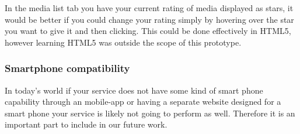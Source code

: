 In the media list tab you have your current rating of media displayed as stars, it would be better if you could change your rating simply by hovering over the star you want to give it and then clicking. This could be done effectively in HTML5, however learning HTML5 was outside the scope of this prototype.

\subsubsection{Smartphone compatibility}
In today's world if your service does not have some kind of smart phone capability through an mobile-app or having a separate website designed for a smart phone your service is likely not going to perform as well. Therefore it is an important part to include in our future work.

